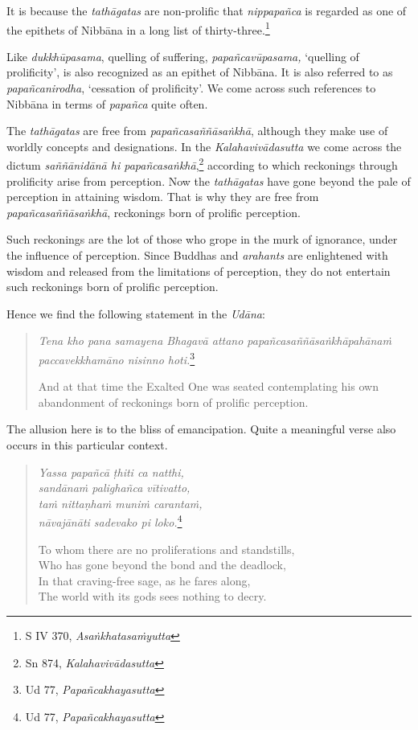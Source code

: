 It is because the \emph{tathāgatas} are non-prolific that \emph{nippapañca} is regarded as one of the epithets of Nibbāna in a long list of thirty-three.\footnote{S IV 370, \emph{Asaṅkhatasaṁyutta}}

Like \emph{dukkhūpasama}, quelling of suffering, \emph{papañcavūpasama,} `quelling of prolificity', is also recognized as an epithet of Nibbāna. It is also referred to as \emph{papañcanirodha}, `cessation of prolificity'. We come across such references to Nibbāna in terms of \emph{papañca} quite often.

The \emph{tathāgatas} are free from \emph{papañcasaññāsaṅkhā}, although they make use of worldly concepts and designations. In the \emph{Kalahavivādasutta} we come across the dictum \emph{saññānidānā hi papañcasaṅkhā},\footnote{Sn 874, \emph{Kalahavivādasutta}} according to which reckonings through prolificity arise from perception. Now the \emph{tathāgatas} have gone beyond the pale of perception in attaining wisdom. That is why they are free from \emph{papañcasaññāsaṅkhā}, reckonings born of prolific perception.

Such reckonings are the lot of those who grope in the murk of ignorance, under the influence of perception. Since Buddhas and \emph{arahants} are enlightened with wisdom and released from the limitations of perception, they do not entertain such reckonings born of prolific perception.

\clearpage

Hence we find the following statement in the \emph{Udāna}:

\begin{quote}
\emph{Tena kho pana samayena Bhagavā attano papañcasaññāsaṅkhāpahānaṁ paccavekkhamāno nisinno hoti.}\footnote{Ud 77, \emph{Papañcakhayasutta}}

And at that time the Exalted One was seated contemplating his own abandonment of reckonings born of prolific perception.
\end{quote}

The allusion here is to the bliss of emancipation. Quite a meaningful verse also occurs in this particular context.

\begin{quote}
\emph{Yassa papañcā ṭhiti ca natthi,}\\
\emph{sandānaṁ palighañca vītivatto,}\\
\emph{taṁ nittaṇhaṁ muniṁ carantaṁ,}\\
\emph{nāvajānāti sadevako pi loko.}\footnote{Ud 77, \emph{Papañcakhayasutta}}

To whom there are no proliferations and standstills,\\
Who has gone beyond the bond and the deadlock,\\
In that craving-free sage, as he fares along,\\
The world with its gods sees nothing to decry.
\end{quote}

